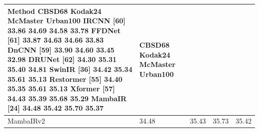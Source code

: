 \begin{tabular}{lllll}
\toprule
Method CBSD68 Kodak24 McMaster Urban100 IRCNN [60] 33.86 34.69 34.58 33.78 FFDNet [61] 33.87 34.63 34.66 33.83 DnCNN [59] 33.90 34.60 33.45 32.98 DRUNet [62] 34.30 35.31 35.40 34.81 SwinIR [36] 34.42 35.34 35.61 35.13 Restormer [55] 34.40 35.35 35.61 35.13 Xformer [57] 34.43 35.39 35.68 35.29 MambaIR [24] 34.48 35.42 35.70 35.37 & CBSD68 Kodak24 McMaster Urban100 &  &  &  \\
\midrule
MambaIRv2 & 34.48 & 35.43 & 35.73 & 35.42 \\
\bottomrule
\end{tabular}
